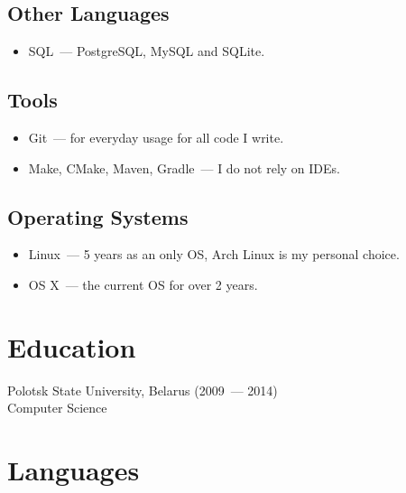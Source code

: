     \subsection*{Other Languages}

      \begin{itemize}

        \item SQL~--- PostgreSQL, MySQL and SQLite.

      \end{itemize}

    \subsection*{Tools}

      \begin{itemize}

        \item Git~--- for everyday usage for all code I write.

        \item Make, CMake, Maven, Gradle~--- I do not rely on IDEs.

      \end{itemize}

    \subsection*{Operating Systems}

      \begin{itemize}

        \item Linux~--- 5 years as an only OS, Arch Linux is my personal choice.

        \item OS X~--- the current OS for over 2 years.

      \end{itemize}


  \section*{Education}

    Polotsk State University, Belarus (2009~--- 2014) \\
    Computer Science


  \section*{Languages}

